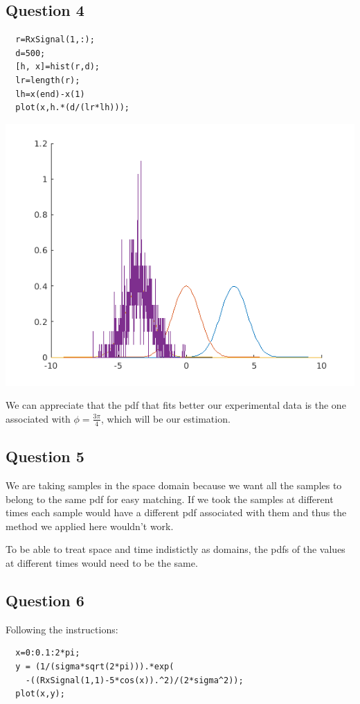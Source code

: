 \documentclass[conference,9pt]{IEEEtran}
\begin{document}
\subsection{Question 4}

\begin{verbatim}
  r=RxSignal(1,:);
  d=500;
  [h, x]=hist(r,d);
  lr=length(r);
  lh=x(end)-x(1)
  plot(x,h.*(d/(lr*lh)));
\end{verbatim}
\includegraphics[scale=0.6]{4}

We can appreciate that the pdf that fits better our experimental data is the one associated with $\phi=\frac{3\pi}{4}$, which will be our estimation.

\subsection{Question 5}
We are taking samples in the space domain because we want all the samples to belong to the same pdf for easy matching. If we took the samples at different times each sample would have a different pdf associated with them and thus the method we applied here wouldn't work.

To be able to treat space and time indistictly as domains, the pdfs of the values at different times would need to be the same.
\subsection{Question 6}
Following the instructions:
\begin{verbatim}
  x=0:0.1:2*pi;
  y = (1/(sigma*sqrt(2*pi))).*exp(
    -((RxSignal(1,1)-5*cos(x)).^2)/(2*sigma^2));
  plot(x,y);
\end{verbatim}
\end{document}
